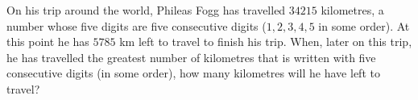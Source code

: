 On his trip around the world, Phileas Fogg has travelled $34215$ kilometres, a number whose five digits are five consecutive digits ($1,2,3,4,5$ in some order). At this point he has $5785$ km left to travel to finish his trip. When, later on this trip, he has travelled the greatest number of kilometres that is written with five consecutive digits (in some order), how many kilometres will he have left to travel?
